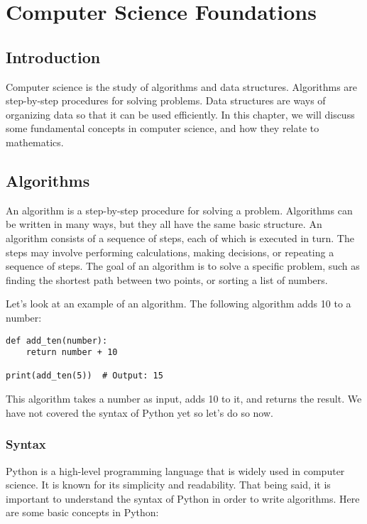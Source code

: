 \chapter{Computer Science Foundations}

\section{Introduction}

Computer science is the study of algorithms and data structures. Algorithms are step-by-step procedures for solving problems. Data structures are ways of organizing data so that it can be used efficiently. In this chapter, we will discuss some fundamental concepts in computer science, and how they relate to mathematics.

\section{Algorithms}

An algorithm is a step-by-step procedure for solving a problem. Algorithms can be written in many ways, but they all have the same basic structure. An algorithm consists of a sequence of steps, each of which is executed in turn. The steps may involve performing calculations, making decisions, or repeating a sequence of steps. The goal of an algorithm is to solve a specific problem, such as finding the shortest path between two points, or sorting a list of numbers.

Let's look at an example of an algorithm. The following algorithm adds 10 to a number:

\begin{lstlisting}
def add_ten(number):
    return number + 10

print(add_ten(5))  # Output: 15
\end{lstlisting}

This algorithm takes a number as input, adds 10 to it, and returns the result. We have not covered the syntax of Python yet so let's do so now.

\subsection{Syntax}

Python is a high-level programming language that is widely used in computer science. It is known for its simplicity and readability. That being said, it is important to understand the syntax of Python in order to write algorithms. Here are some basic concepts in Python:

